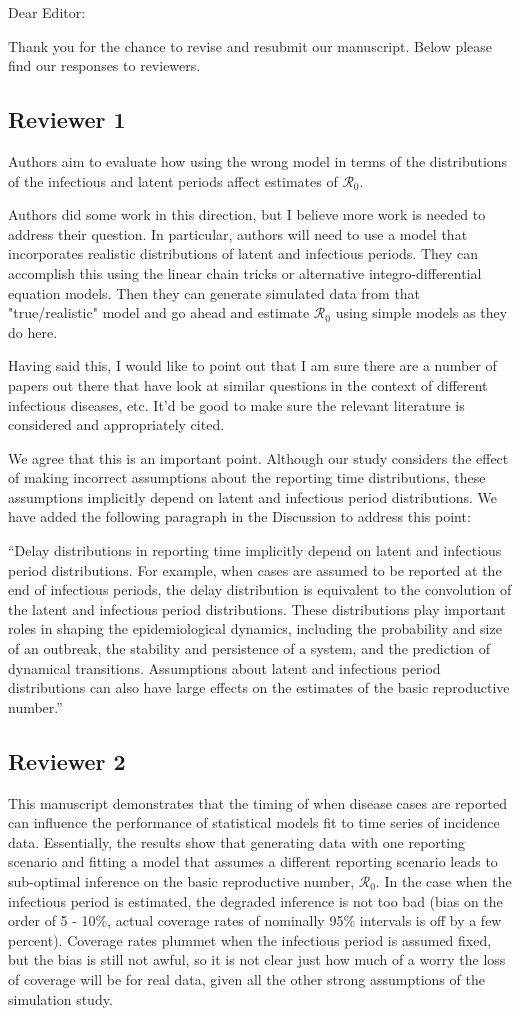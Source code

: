 \documentclass[12pt]{article}
\newcommand{\rev}{\subsection*}
\newcommand{\revtext}{\textsf}
\begin{document}
\noindent Dear Editor:

Thank you for the chance to revise and resubmit our manuscript. 
Below please find our responses to reviewers.

\rev{Reviewer 1}

\revtext{Authors aim to evaluate how using the wrong model in terms of the distributions of the infectious and latent periods affect estimates of $\mathcal R_0$.}

\revtext{Authors did some work in this direction, but I believe more work is needed to address their question. In particular, authors will need to use a model that incorporates realistic distributions of latent and infectious periods. They can accomplish this using the linear chain tricks or alternative integro-differential equation models. Then they can generate simulated data from that "true/realistic" model and go ahead and estimate $\mathcal R_0$ using simple models as they do here.}

\revtext{Having said this, I would like to point out that I am sure there are a number of papers out there that have look at similar questions in the context of different infectious diseases, etc. It'd be good to make sure the relevant literature is considered and appropriately cited.}

We agree that this is an important point. Although our study considers the effect of making incorrect assumptions about the reporting time distributions, these assumptions implicitly depend on latent and infectious period distributions. We have added the following paragraph in the Discussion to address this point:

``Delay distributions in reporting time implicitly depend on latent and infectious 
period distributions. For example, when cases are assumed to be reported
at the end of infectious periods,
the delay distribution is equivalent to the convolution of the latent and
infectious period distributions. These distributions play important roles in 
shaping the epidemiological dynamics, including the probability and size of an outbreak, 
the stability and persistence of a system, and the 
prediction of dynamical transitions. Assumptions about
latent and infectious period distributions can also have large effects on the
estimates of the basic reproductive number.''


\rev{Reviewer 2}

\revtext{This manuscript demonstrates that the timing of when disease cases are reported can influence the performance of statistical models fit to time series of incidence data.  Essentially, the results show that generating data with one reporting scenario and fitting a model that assumes a different reporting scenario leads to sub-optimal inference on the basic reproductive number, $\mathcal R_0$.  In the case when the infectious period is estimated, the degraded inference is not too bad (bias on the order of 5 - 10\%, actual coverage rates of nominally 95\% intervals is off by a few percent).  Coverage rates plummet when the infectious period is assumed fixed, but the bias is still not awful, so it is not clear just how much of a worry the loss of coverage will be for real data, given all the other strong assumptions of the simulation study.}
\end{document}
